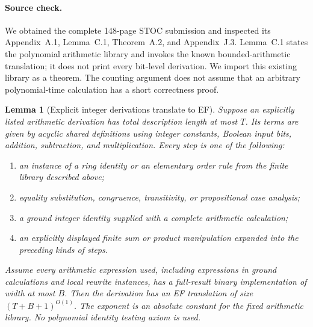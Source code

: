 \documentclass[11pt]{article}
\newtheorem{lemma}[theorem]{Lemma}
\theoremstyle{definition}
\theoremstyle{remark}
\begin{document}
\paragraph{Source check.}
We obtained the complete 148-page STOC submission and inspected its
Appendix~A.1, Lemma~C.1, Theorem~A.2, and Appendix~J.3. Lemma~C.1
states the polynomial arithmetic library and invokes the known
bounded-arithmetic translation; it does not print every bit-level
derivation. We import this existing library as a theorem. The counting
argument does not assume that an arbitrary polynomial-time calculation
has a short correctness proof.

\begin{lemma}[Explicit integer derivations translate to EF]
\label{lem:integer-derivation-ef}
Suppose an explicitly listed arithmetic derivation has total description
length at most $T$. Its terms are given by acyclic shared definitions
using integer constants, Boolean input bits, addition, subtraction, and
multiplication. Every step is one of the following:
\begin{enumerate}
\item an instance of a ring identity or an elementary order rule from
the finite library described above;
\item equality substitution, congruence, transitivity, or propositional
case analysis;
\item a ground integer identity supplied with a complete arithmetic
calculation;
\item an explicitly displayed finite sum or product manipulation
expanded into the preceding kinds of steps.
\end{enumerate}
Assume every arithmetic expression used, including expressions in
ground calculations and local rewrite instances, has a full-result
binary implementation of width at most $B$. Then the derivation has
an EF translation of size $(T+B+1)^{O(1)}$. The exponent is an absolute
constant for the fixed arithmetic library. No polynomial identity
testing axiom is used.
\end{lemma}
\end{document}
